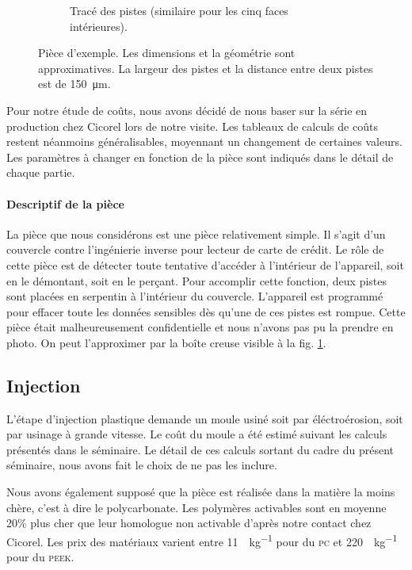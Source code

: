 \begin{figure}[h]
\begin{subfigure}[t]{0.4\textwidth}
                \caption{Tracé des pistes (similaire pour les cinq faces intérieures).}
        \end{subfigure}

        \caption{Pièce d'exemple. Les dimensions et la géométrie sont approximatives. La largeur des pistes et la distance entre deux pistes est de \SI{150}{\micro\meter}.}
        \label{fig:example-part}
\end{figure}
Pour notre étude de coûts, nous avons décidé de nous baser sur la série en production chez Cicorel lors de notre visite.
Les tableaux de calculs de coûts restent néanmoins généralisables, moyennant un changement de certaines valeurs.
Les paramètres à changer en fonction de la pièce sont indiqués dans le détail de chaque partie.


\paragraph{Descriptif de la pièce}
La pièce que nous considérons est une pièce relativement simple.
Il s'agit d'un couvercle contre l'ingénierie inverse pour lecteur de carte de crédit.
Le rôle de cette pièce est de détecter toute tentative d'accéder à l'intérieur de l'appareil, soit en le démontant, soit en le perçant.
Pour accomplir cette fonction, deux pistes sont placées en serpentin à l'intérieur du couvercle.
L'appareil est programmé pour effacer toute les données sensibles dès qu'une de ces pistes est rompue.
Cette pièce était malheureusement confidentielle et nous n'avons pas pu la prendre en photo.
On peut l'approximer par la boîte creuse visible à la fig. \ref{fig:example-part}.


\subsection{Injection}

L'étape d'injection plastique demande un moule usiné soit par éléctroérosion, soit par usinage à grande vitesse.
Le coût du moule a été estimé suivant les calculs présentés dans le séminaire\cite{electroerosion-2013}.
Le détail de ces calculs sortant du cadre du présent séminaire, nous avons fait le choix de ne pas les inclure. 

Nous avons également supposé que la pièce est réalisée dans la matière la moins chère, c'est à dire le polycarbonate.
Les polymères activables sont en moyenne 20\% plus cher que leur homologue non activable d'après notre contact chez Cicorel.
Les prix des matériaux varient entre \SI{11}{\chf\per\kilogram} pour du \textsc{pc} et \SI{220}{\chf\per\kilogram} pour du \textsc{peek}.
\clearpage

